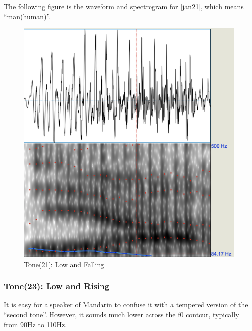 \documentclass[a4paper]{article}
\begin{document}
The following figure is the waveform and spectrogram for [jan21], which means ``man(human)''. 
\begin{figure}[H]
    \centering
    \includegraphics[scale=0.4]{imgs/tone21.png}
    \caption{Tone(21): Low and Falling}
\end{figure}

\subsubsection{Tone(23): Low and Rising}
It is easy for a speaker of Mandarin to confuse it with a tempered version of the ``second tone''. However, it sounds much lower across the f0 contour, typically from 90Hz to 110Hz. 
\end{document}
